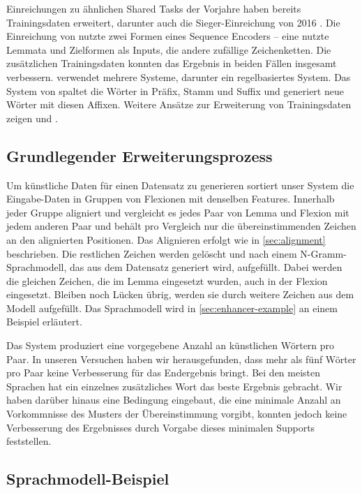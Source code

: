 \documentclass[11pt,a4paper]{article}
\begin{document}
Einreichungen zu ähnlichen Shared Tasks der Vorjahre haben bereits Trainingsdaten erweitert, darunter auch die Sieger-Einreichung von 2016 \cite{kann-schutze:2016:SIGMORPHON}. Die Einreichung von \citet{bergmanis:augmenting} nutzte zwei Formen eines Sequence Encoders -- eine nutzte Lemmata und Zielformen als Inputs, die andere zufällige Zeichenketten. Die zusätzlichen Trainingsdaten konnten das Ergebnis in beiden Fällen insgesamt verbessern. \citet{kann-schutze:2017:K17-20} verwendet mehrere Systeme, darunter ein regelbasiertes System. Das System von \citet{silfverberg-EtAl:2017:K17-20} spaltet die Wörter in Präfix, Stamm und Suffix und generiert neue Wörter mit diesen Affixen. Weitere Ansätze zur Erweiterung von Trainingsdaten zeigen \cite{zhou-neubig:2017:K17-20} und \cite{nicolai-EtAl:2017:K17-20}.

\subsection{Grundlegender Erweiterungsprozess}
Um künstliche Daten für einen Datensatz zu generieren sortiert unser System die Eingabe-Daten in Gruppen von Flexionen mit denselben Features. Innerhalb jeder Gruppe aligniert und vergleicht es jedes Paar von Lemma und Flexion mit jedem anderen Paar und behält pro Vergleich nur die übereinstimmenden Zeichen an den alignierten Positionen. Das Alignieren erfolgt wie in \autoref{sec:alignment} beschrieben. Die restlichen Zeichen werden gelöscht und nach einem N-Gramm-Sprachmodell, das aus dem Datensatz generiert wird, aufgefüllt. Dabei werden die gleichen Zeichen, die im Lemma eingesetzt wurden, auch in der Flexion eingesetzt. Bleiben noch Lücken übrig, werden sie durch weitere Zeichen aus dem Modell aufgefüllt. Das Sprachmodell wird in \autoref{sec:enhancer-example} an einem Beispiel erläutert.

Das System produziert eine vorgegebene Anzahl an künstlichen Wörtern pro Paar. In unseren Versuchen haben wir herausgefunden, dass mehr als fünf Wörter pro Paar keine Verbesserung für das Endergebnis bringt. Bei den meisten Sprachen hat ein einzelnes zusätzliches Wort das beste Ergebnis gebracht. Wir haben darüber hinaus eine Bedingung eingebaut, die eine minimale Anzahl an Vorkommnisse des Musters der Übereinstimmung vorgibt, konnten jedoch keine Verbesserung des Ergebnisses durch Vorgabe dieses minimalen Supports feststellen.

\subsection{Sprachmodell-Beispiel}
\label{sec:enhancer-example}
\end{document}
